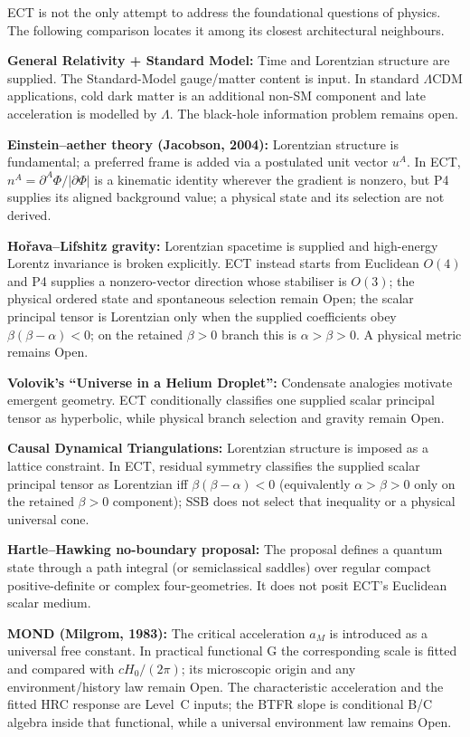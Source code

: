 \documentclass[11pt,a4paper]{article}
\begin{document}
ECT is not the only attempt to address the foundational questions of physics. The following comparison locates it among its closest architectural neighbours.

\textbf{General Relativity + Standard Model:} Time and Lorentzian structure
are supplied.  The Standard-Model gauge/matter content is input.  In standard
$\Lambda$CDM applications, cold dark matter is an additional non-SM
component and late acceleration is modelled by $\Lambda$.  The black-hole
information problem remains open.

\textbf{Einstein--aether theory (Jacobson, 2004):} Lorentzian structure is fundamental; a preferred frame is added via a postulated unit vector $u^A$. In ECT, $n^A=\partial^A\Phi/|\partial\Phi|$ is a kinematic identity wherever the gradient is nonzero, but P4 supplies its aligned background value; a physical state and its selection are not derived.

\textbf{Ho\v{r}ava--Lifshitz gravity:} Lorentzian spacetime is supplied and
high-energy Lorentz invariance is broken explicitly.  ECT instead starts
from Euclidean $O(4)$ and P4 supplies a nonzero-vector direction whose
stabiliser is $O(3)$; the physical ordered state and spontaneous selection
remain Open;
the scalar principal tensor is Lorentzian only when the supplied
coefficients obey $\beta(\beta-\alpha)<0$; on the retained
$\beta>0$ branch this is $\alpha>\beta>0$.  A physical metric remains Open.

\textbf{Volovik's ``Universe in a Helium Droplet'':} Condensate analogies motivate emergent geometry.  ECT conditionally classifies one supplied scalar principal tensor as hyperbolic, while physical branch selection and gravity remain Open.

\textbf{Causal Dynamical Triangulations:} Lorentzian structure is imposed as a lattice constraint. In ECT, residual symmetry classifies the supplied scalar principal tensor as Lorentzian iff $\beta(\beta-\alpha)<0$ (equivalently $\alpha>\beta>0$ only on the retained $\beta>0$ component); SSB does not select that inequality or a physical universal cone.

\textbf{Hartle--Hawking no-boundary proposal:} The proposal defines a quantum
state through a path integral (or semiclassical saddles) over regular compact
positive-definite or complex four-geometries.  It does not posit ECT's
Euclidean scalar medium.

\textbf{MOND (Milgrom, 1983):} The critical acceleration $a_M$ is introduced as a universal free constant. In practical functional G the corresponding scale is fitted and compared with $cH_0/(2\pi)$; its microscopic origin and any environment/history law remain Open. The characteristic acceleration and the fitted HRC response are Level~C inputs; the BTFR slope is conditional B/C algebra inside that functional, while a universal environment law remains Open.
\end{document}
